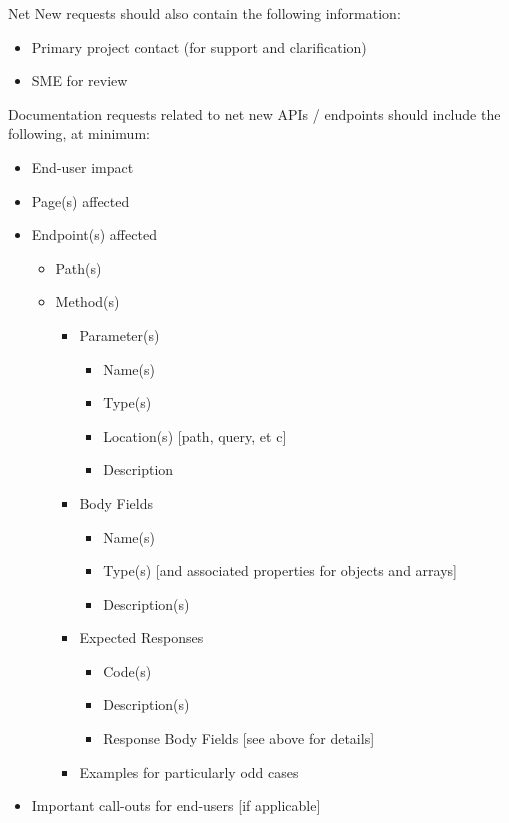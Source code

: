 \documentclass[a4paper]{article}
\begin{document}
Net New requests should also contain the following information:
\begin{itemize}
	\item Primary project contact (for support and clarification)
	\item SME for review
\end{itemize}

Documentation requests related to net new APIs / endpoints should include the following, at minimum:
\begin{itemize}
	\item End-user impact
	\item Page(s) affected
	\item Endpoint(s) affected
	\begin{itemize}
		\item Path(s)
		\item Method(s)
		\begin{itemize}
			\item Parameter(s)
			\begin{itemize}
				\item Name(s)
				\item Type(s)
				\item Location(s) [path, query, et c]
				\item Description
			\end{itemize}
			\item Body Fields
			\begin{itemize}
				\item Name(s)
				\item Type(s) [and associated properties for objects and arrays]
				\item Description(s)
			\end{itemize}
			\item Expected Responses
			\begin{itemize}
				\item Code(s)
				\item Description(s)
				\item Response Body Fields [see above for details]
			\end{itemize}
			\item Examples for particularly odd cases
		\end{itemize}
	\end{itemize}
	\item Important call-outs for end-users [if applicable]
\end{itemize}
\end{document}
